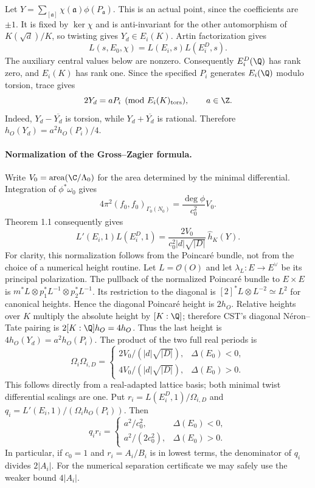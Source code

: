 Let $Y=\sum_{[\mathfrak a]}\chi(\mathfrak a)\phi(P_{\mathfrak a})$.
This is an actual point, since the coefficients are $\pm1$.
It is fixed by $\ker\chi$ and is anti-invariant for the other
automorphism of $K(\sqrt d)/K$, so twisting gives
$Y_d\in E_i(K)$. Artin factorization gives
\[
 L(s,E_0,\chi)=L(E_i,s)L(E_i^D,s).
\]
The auxiliary central values below are nonzero. Consequently
$E_i^D(\Q)$ has rank zero, and $E_i(K)$ has rank one. Since the
specified $P_i$ generates $E_i(\Q)$ modulo torsion, trace gives
\[
 2Y_d=aP_i\pmod{E_i(K)_{\rm tors}},\qquad a\in\Z.
\]
Indeed, $Y_d-\overline{Y_d}$ is torsion, while
$Y_d+\overline{Y_d}$ is rational. Therefore
$h_O(Y_d)=a^2h_O(P_i)/4$.

\paragraph{Normalization of the Gross--Zagier formula.}
Write $V_0=\operatorname{area}(\C/\Lambda_0)$ for the area determined
by the minimal differential. Integration of $\phi^*\omega_0$ gives
\[
 4\pi^2(f_0,f_0)_{\Gamma_0(N_0)}
 =\frac{\deg\phi}{c_0^2}V_0.
\]
Theorem 1.1 consequently gives
\[
 L'(E_i,1)L(E_i^D,1)
 =\frac{2V_0}{c_0^2|d|\sqrt{|D|}}\,\widehat h_K(Y).
\]
For clarity, this normalization follows from the Poincar\'e bundle,
not from the choice of a numerical height routine. Let $L=\mathcal O(O)$
and let $\lambda_L:E\to E^\vee$ be its principal polarization.
The pullback of the normalized Poincar\'e bundle to $E\times E$
is $m^*L\otimes p_1^*L^{-1}\otimes p_2^*L^{-1}$. Its restriction
to the diagonal is $[2]^*L\otimes L^{-2}\simeq L^2$ for canonical
heights. Hence the diagonal Poincar\'e height is $2h_O$. Relative
heights over $K$ multiply the absolute height by $[K:\Q]$;
therefore CST's diagonal N\'eron--Tate pairing is
$2[K:\Q]h_O=4h_O$. Thus the last height is
$4h_O(Y_d)=a^2h_O(P_i)$. The product of the two full real periods is
\[
 \Omega_i\Omega_{i,D}=
 \begin{cases}
 2V_0/(|d|\sqrt{|D|}),&\Delta(E_0)<0,\\
 4V_0/(|d|\sqrt{|D|}),&\Delta(E_0)>0.
 \end{cases}
\]
This follows directly from a real-adapted lattice basis; both
minimal twist differential scalings are one. Put
$r_i=L(E_i^D,1)/\Omega_{i,D}$ and
$q_i=L'(E_i,1)/(\Omega_i h_O(P_i))$. Then
\[
 q_ir_i=\begin{cases}
 a^2/c_0^2,&\Delta(E_0)<0,\\
 a^2/(2c_0^2),&\Delta(E_0)>0.
 \end{cases}
\]
In particular, if $c_0=1$ and $r_i=A_i/B_i$ is in lowest terms,
the denominator of $q_i$ divides $2|A_i|$. For the numerical
separation certificate we may safely use the weaker bound
$4|A_i|$.

